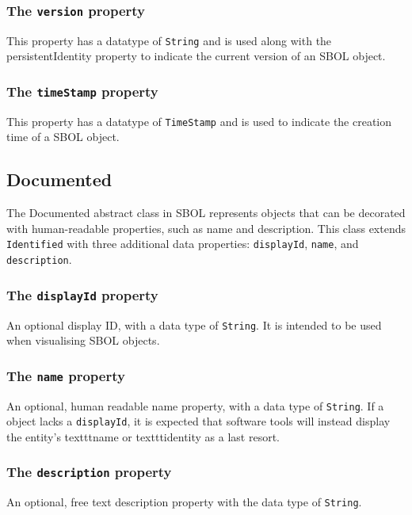 \documentclass[draftspec]{sbmlpkgspec}
\begin{document}
\subsubsection{The \texttt{version} property}
This property has a datatype of \texttt{String} and is used along with the persistentIdentity property to indicate the current version of an SBOL object.

\subsubsection{The \texttt{timeStamp} property}
This property has a datatype of \texttt{TimeStamp} and is used to indicate the creation time of a SBOL object.


\subsection {Documented}
The Documented abstract class in SBOL represents objects that can be decorated with human-readable properties, such as name and description. This class extends \texttt{Identified} with three additional data properties: \texttt{displayId}, \texttt{name}, and \texttt{description}. 

\subsubsection{The \texttt{displayId} property}
An optional display ID, with a data type of \texttt{String}. It is intended to be used when visualising SBOL objects.

\subsubsection{The \texttt{name} property}
An optional, human readable name property, with a data type of \texttt{String}. If a  object lacks a \texttt{displayId}, it is expected that software tools will instead display the entity's texttt{name} or texttt{identity} as a last resort.

\subsubsection{The \texttt{description} property}
An optional, free text description property with the data type of \texttt{String}.
\end{document}

